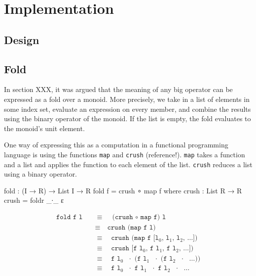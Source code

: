 \chapter{Implementation}

\section{Design}

\section{Fold}

In section XXX, it was argued that the meaning of any big operator can be expressed as a fold over a monoid. More precisely, we take in a list of elements in some index set, evaluate an expression on every member, and combine the results using the binary operator of the monoid. If the list is empty, the fold evaluates to the monoid's unit element.

One way of expressing this as a computation in a functional programming language is using the functions \texttt{map} and \texttt{crush} (reference!). \texttt{map} takes a function and a list and applies the function to each element of the list. \texttt{crush} reduces a list using a binary operator.

\begin{listing}[h]
\begin{agdacode}
fold : (I → R) → List I → R
fold f = crush ∘ map f
  where
    crush : List R → R
    crush = foldr _∙_ ε
\end{agdacode}
\end{listing}

\begin{align*}
\texttt{fold f l}
\quad&\equiv\quad \texttt{(crush \(\circ\) map f) l} \\
\quad&\equiv\quad \texttt{crush (map f l)} \\
\quad&\equiv\quad \texttt{crush (map f [\(\texttt{l}_0\), \(\texttt{l}_1\), \(\texttt{l}_2\), \ldots])} \\
\quad&\equiv\quad \texttt{crush [f \(\texttt{l}_0\), f \(\texttt{l}_1\), f \(\texttt{l}_2\), \ldots])} \\
\quad&\equiv\quad \texttt{f \(\texttt{l}_0\) \(\cdot\) (f \(\texttt{l}_1\) \(\cdot\) (f \(\texttt{l}_2\) \(\cdot\) \(\ldots\)))} \\
\quad&\equiv\quad \texttt{f \(\texttt{l}_0\) \(\cdot\) f \(\texttt{l}_1\) \(\cdot\) f \(\texttt{l}_2\) \(\cdot\) \(\ldots\)}
\end{align*}

